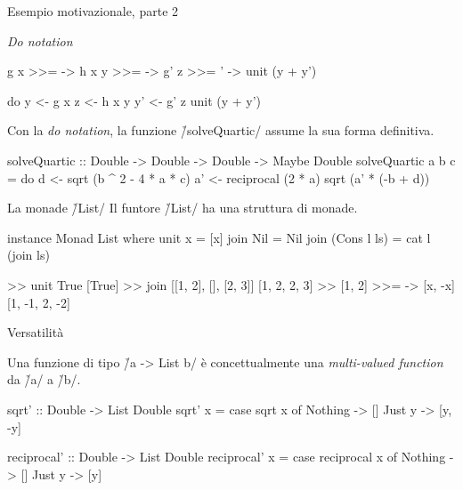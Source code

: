 \begin{frame}[fragile]{\secname}{Esempio motivazionale, parte 2}
\begin{block}{\emph{Do notation}}
\begin{minipage}[t]{0.48\textwidth}
\vspace{-0.3cm}
\begin{haskellcode}
    g x   >>= \y  ->
    h x y >>= \z  ->
    g' z  >>= \y' ->
    unit (y + y')
\end{haskellcode}
\end{minipage}
\hfill\pause
\begin{minipage}[t]{0.48\textwidth}
\vspace{-0.3cm}
\begin{haskellcode}
do  y  <- g x
    z  <- h x y
    y' <- g' z
    unit (y + y')
\end{haskellcode}
\end{minipage}
\end{block}
\pause

Con la \emph{do notation}, la funzione \h/solveQuartic/ assume la sua forma definitiva.
\pause

\begin{haskellcode}
solveQuartic
    :: Double -> Double -> Double -> Maybe Double
solveQuartic a b c = do
    d  <- sqrt (b ^ 2 - 4 * a * c)
    a' <- reciprocal (2 * a)
    sqrt (a' * (-b + d))
\end{haskellcode}
\end{frame}

\begin{frame}[fragile]{\secname}{La monade \h/List/}
Il funtore \h/List/ ha una struttura di monade.
\pause

\begin{haskellcode}
instance Monad List where
    unit x = [x]
    join Nil = Nil
    join (Cons l ls) = cat l (join ls)
\end{haskellcode}
\pause

\begin{runhaskell}
>>  unit True
    [True]
>>  join [[1, 2], [], [2, 3]]
    [1, 2, 2, 3]
>>  [1, 2] >>= \x -> [x, -x]
    [1, -1, 2, -2]
\end{runhaskell}
\end{frame}

\begin{frame}[fragile]{\secname}{Versatilità}

Una funzione di tipo \h/a -> List b/ è concettualmente una \emph{multi-valued function} da \h/a/ a \h/b/.
\pause

\begin{haskellcode}
sqrt' :: Double -> List Double
sqrt' x = case sqrt x of
    Nothing -> []
    Just y  -> [y, -y]

reciprocal' :: Double -> List Double
reciprocal' x = case reciprocal x of
    Nothing -> []
    Just y  -> [y]
\end{haskellcode}
\end{frame}


